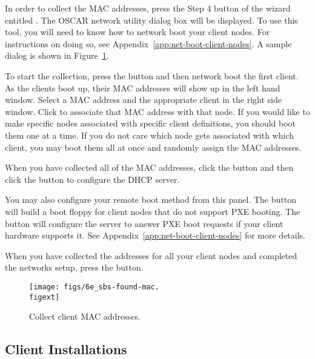 In order to collect the MAC addresses, press the Step 4 button of the
wizard entitled . The OSCAR network utility
dialog box will be displayed.  To use this tool, you will need to know
how to network boot your client nodes.  For instructions on doing so,
see Appendix~\ref{app:net-boot-client-nodes}. A sample dialog is shown
in Figure~\ref{fig:detailed-collect-mac}.

To start the collection, press the  button
and then network boot the first client.  As the clients boot up, their
MAC addresses will show up in the left hand window. Select a MAC
address and the appropriate client in the right side window. Click
 to associate that MAC address with that
node. If you would like to make specific nodes associated with
specific client definitions, you should boot them one at a time. If
you do not care which node gets associated with which client, you may
boot them all at once and randomly assign the MAC addresses.

When you have collected all of the MAC addresses, click the
 button and then click the  button to configure the DHCP server.
 
You may also configure your remote boot method from this panel. The
 button will build a boot floppy for
client nodes that do not support PXE booting. The  button will configure the server to answer PXE boot
requests if your client hardware supports it. See
Appendix~\ref{app:net-boot-client-nodes} for more details.  

When you have collected the addresses for all your client nodes and
completed the networks setup, press the  button.

\begin{figure}[htbp]
  \begin{center}
    \texttt{[image: figs/6e\_sbs-found-mac.\\figext]}
    \caption{Collect client MAC addresses.}
    \label{fig:detailed-collect-mac}
  \end{center}
\end{figure}


\subsection{Client Installations}
\label{det:clientinstall}


